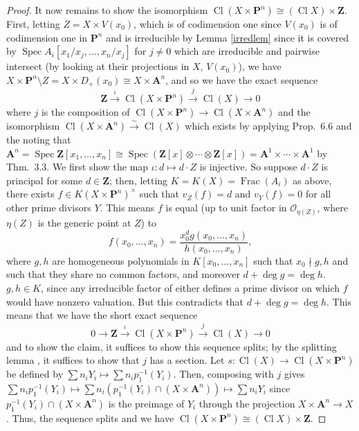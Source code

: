 \documentclass[12pt,letterpaper]{article}
\theoremstyle{definition}
\theoremstyle{remark}
\numberwithin{equation}{section}
\numberwithin{figure}{problem}
\DeclareMathOperator{\Spec}{Spec}
\DeclareMathOperator{\Frac}{Frac}
\DeclareMathOperator{\Cl}{Cl}
\newcommand{\OO}{\mathcal{O}}
\newcommand{\isoto}{\overset{\sim}{\to}}
\begin{document}
\begin{proof}
  \par It now remains to show the isomorphism $\Cl(X \times \mathbf{P}^n) \cong (\Cl X) \times \mathbf{Z}$. First, letting $Z = X \times V(x_0)$, which is of codimension one since $V(x_0)$ is of codimension one in $\mathbf{P}^n$ and is irreducible by Lemma \ref{irredlem} since it is covered by $\Spec A_i[x_1/x_j,\ldots,x_n/x_j]$ for $j\ne0$ which are irreducible and pairwise intersect (by looking at their projections in $X$, $V(x_0)$), we have $X \times \mathbf{P}^n \setminus Z = X \times D_+(x_0) \cong X \times \mathbf{A}^n$, and so we have the exact sequence
  \begin{equation*}
    \mathbf{Z} \overset{\iota}{\longrightarrow} \Cl(X \times \mathbf{P}^n) \overset{j}{\longrightarrow} \Cl(X) \longrightarrow 0
  \end{equation*}
  where $j$ is the composition of $\Cl(X \times \mathbf{P}^n) \to \Cl(X \times \mathbf{A}^n)$ and the isomorphism $\Cl(X \times \mathbf{A}^n) \isoto \Cl(X)$ which exists by applying Prop.~6.6 and the noting that $\mathbf{A}^n = \Spec \mathbf{Z}[x_1,\ldots,x_n] \cong \Spec (\mathbf{Z}[x] \otimes \cdots \otimes \mathbf{Z}[x]) = \mathbf{A}^1 \times \cdots \times \mathbf{A}^1$ by Thm.~3.3. We first show the map $\iota\colon d \mapsto d \cdot Z$ is injective. So suppose $d \cdot Z$ is principal for some $d \in \mathbf{Z}$; then, letting $K = K(X) = \Frac(A_i)$ as above, there exists $f \in K(X \times \mathbf{P}^n)^\times$ such that $v_Z(f) = d$ and $v_Y(f) = 0$ for all other prime divisors $Y$. This means $f$ is equal (up to unit factor in $\OO_{\eta(Z)}$, where $\eta(Z)$ is the generic point at $Z$) to
  \begin{equation*}
    f(x_0,\ldots,x_n) = \frac{x_0^dg(x_0,\ldots,x_n)}{h(x_0,\ldots,x_n)},
  \end{equation*}
  where $g,h$ are homogeneous polynomials in $K[x_0,\ldots,x_n]$ such that $x_0 \nmid g,h$ and such that they share no common factors, and moreover $d + \deg g = \deg h$. $g,h \in K$, since any irreducible factor of either defines a prime divisor on which $f$ would have nonzero valuation. But this contradicts that $d + \deg g = \deg h$. This means that we have the short exact sequence
  \begin{equation*}
    0 \longrightarrow \mathbf{Z} \overset{\iota}{\longrightarrow} \Cl(X \times \mathbf{P}^n) \overset{j}{\longrightarrow} \Cl(X) \longrightarrow 0
  \end{equation*}
  and to show the claim, it suffices to show this sequence splits; by the splitting lemma \cite[Prop.-Def.~2.10]{Rei95}, it suffices to show that $j$ has a section. Let $s \colon \Cl(X) \to \Cl(X \times \mathbf{P}^n)$ be defined by $\sum n_iY_i \mapsto \sum n_i p_1^{-1}(Y_i)$. Then, composing with $j$ gives $\sum n_i p_1^{-1}(Y_i) \mapsto \sum n_i (p_1^{-1}(Y_i) \cap (X \times \mathbf{A}^n)) \mapsto \sum n_iY_i$ since $p_1^{-1}(Y_i) \cap (X \times \mathbf{A}^n)$ is the preimage of $Y_i$ through the projection $X \times \mathbf{A}^n \to X$. Thus, the sequence splits and we have $\Cl(X \times \mathbf{P}^n) \cong (\Cl X) \times \mathbf{Z}$.
\end{proof}
\end{document}
